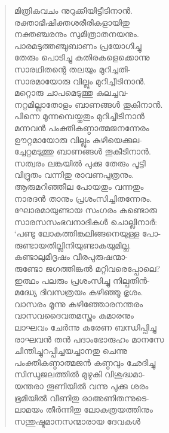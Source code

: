 \begin{verse}
മിത്രികവചം നുറുക്കിയിട്ടീടിനാന്‍.\\
രക്താഭിഷിക്തശരീരികളായിതു\\
നക്തഞ്ചരനും സുമിത്രാതനയനും.\\
പാരമടുത്തഞ്ചുബാണം പ്രയോഗിച്ചു\\
തേരും പൊടിച്ചു കുതിരകളെക്കൊന്നു\\
സാരഥിതന്റെ തലയും മുറിച്ചതി-\\
സാരമായോരു വില്ലും മുറിച്ചീടിനാന്‍.\\
മറ്റൊരു ചാപമെടുത്തു കുലച്ചവ-\\
നറ്റമില്ലാതോളം ബാണങ്ങള്‍ തൂകിനാന്‍.\\
പിന്നെ മൂന്നമ്പെയ്തതും മുറിച്ചീടിനാന്‍\\
മന്നവന്‍ പംക്തികണ്ഠാത്മജനന്നേരം\\
ഊറ്റമായോരു വില്ലും കുഴിയെക്കുല-\\
ച്ചേറ്റമടുത്തു ബാണങ്ങള്‍ തൂകീടിനാന്‍.\\
സത്വരം ലങ്കയില്‍ പുക്കു തേരും പൂട്ടി\\
വിദ്രുതം വന്നിതു രാവണപുത്രനും.\\
ആരുമറിഞ്ഞീല പോയതും വന്നതും\\
നാരദന്‍ താനും പ്രശംസിച്ചിതന്നേരം.\\
ഘോരമായുണ്ടായ സംഗരം കണ്ടൊരു\\
സാരസസംഭവനാദികള്‍ ചൊല്ലിനാര്‍:\\
‘പണ്ടു ലോകത്തിങ്കലിങ്ങനെയുള്ള പോ-\\
രുണ്ടായതില്ലിനിയുണ്ടാകയുമില്ല.\\
കണ്ടാലുമീദൃഷം വീരപുരുഷന്മാ-\\
രുണ്ടോ ജഗത്തിങ്കല്‍ മറ്റിവരെപ്പോലെ?\\
ഇത്ഥം പലരും പ്രശംസിച്ചു നില്പതിന്‍-\\
മദ്ധ്യേ ദിവസത്രയം കഴിഞ്ഞൂ ഭൃശം.\\
വാസരം മൂന്നു കഴിഞ്ഞോരനന്തരം\\
വാസവദൈവതമസ്ത്രം കുമാരനും\\
ലാഘവം ചേര്‍ന്നു കരേണ ബന്ധിപ്പിച്ചു\\
രാഘവന്‍ തന്‍ പദാംഭോരുഹം മാനസേ\\
ചിന്തിച്ചുറപ്പിച്ചയച്ചാനതു ചെന്നു\\
പംക്തികണ്ഠാത്മജന്‍ കണ്ഠവും ഛേദിച്ചു\\
സിന്ധുജലത്തില്‍ മുഴുകി വിശുദ്ധമാ-\\
യന്തരാ തൂണിയില്‍ വന്നു പുക്കു ശരം\\
ഭൂമിയില്‍ വീണിതു രാഅണിതന്നുടെ-\\
ലാമയം തീര്‍ന്നിതു ലോകത്രയത്തിനും\\
സന്തുഷ്ടമാനസന്മാരായ ദേവകള്‍\\

\end{verse}
